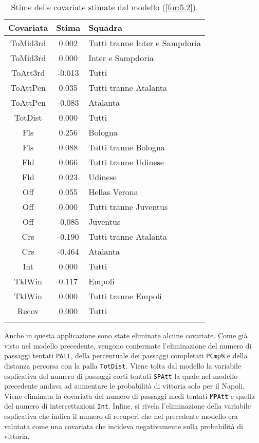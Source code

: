 \begin{table}[]%
	
	\renewcommand{\arraystretch}{1.7}
	\centering
	\begin{tabular}{ccp{10cm}}
		\hline	
		
		\textbf{Covariata} & \textbf{Stima} & \textbf{Squadra} \\	
		\hline
		ToMid3rd & 0.002 & Tutti tranne Inter e Sampdoria\\
		ToMid3rd & 0.000 & Inter e Sampdoria\\
		ToAtt3rd & -0.013 & Tutti \\  
		ToAttPen & 0.035 & Tutti tranne Atalanta \\    
		ToAttPen & -0.083 & Atalanta \\ 	     	 
		TotDist & 0.000 & Tutti \\	
		Fls & 0.256 & Bologna  \\
		Fls & 0.088 & Tutti tranne Bologna \\ 		
		Fld & 0.066 & Tutti tranne Udinese \\
		Fld & 0.023 & Udinese \\
		Off & 0.055 & Hellas Verona\\
		Off & 0.000 & Tutti tranne Juventus\\
		Off & -0.085 & Juventus  \\
		Crs & -0.190 & Tutti tranne Atalanta\\
		Crs & -0.464 & Atalanta \\
		Int & 0.000 & Tutti\\
		TklWin &  0.117 & Empoli  \\
		TklWin &  0.000 & Tutti tranne Empoli  \\ 
		Recov &  0.000 & Tutti \\ 
		\hline
		& &  \\
		
	\end{tabular} \hbox{}
	\caption{Stime delle covariate stimate dal modello (\ref{for:5.2}).} \label{tab:BTCLI3} 
	
\end{table}
Anche in questa applicazione sono state eliminate alcune covariate. Come già visto nel modello precedente, vengono confermate l'eliminazione del numero di passaggi tentati \texttt{PAtt}, della percentuale dei passaggi completati \texttt{PCmp\%} e della distanza percorsa con la palla \texttt{TotDist}. Viene tolta dal modello la variabile esplicativa del numero di passaggi corti tentati \texttt{SPAtt} la quale nel modello precedente andava ad aumentare le probabilità di vittoria solo per il Napoli. Viene eliminata la covariata del numero di passaggi medi tentati \texttt{MPAtt} e quella del numero di intercettazioni \texttt{Int}. Infine, si rivela l'eliminazione della variabile esplicativa che indica il numero di recuperi che nel precedente modello era valutata come una covariata che incideva negativamente sulla probabilità di vittoria.\\

